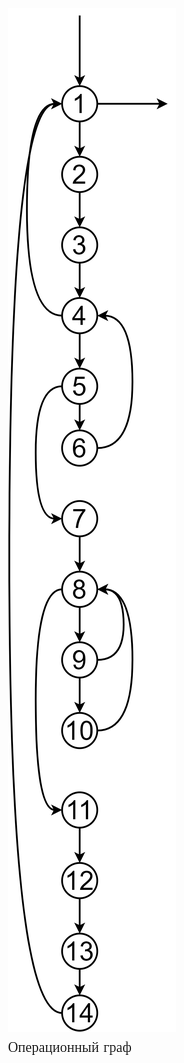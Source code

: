 \begin{figure}[h]
	\centering
	\includegraphics[height=0.9\textheight]{img/ГУ.png}
	\caption{Операционный граф}
	\label{fig:g1}
\end{figure}


